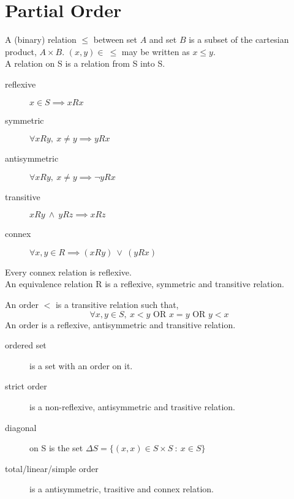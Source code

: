 \section{Partial Order}
	\begin{definition}
		A (binary) relation $\leq$ between set $A$ and set $B$
		is a subset of the cartesian product, $A \times B$.
		$(x,y) \in\ \leq $ may be written as $x \leq y$.\\
		A relation on S is a relation from S into S.
	\end{definition}
	\begin{description}
		\item[reflexive] $x \in S \implies xRx $
		\item[symmetric] $\forall xRy,\ x \neq y \implies yRx$
		\item[antisymmetric] $\forall xRy,\ x \neq y \implies \neg yRx$
		\item[transitive] $xRy\ \wedge \ yRz \implies xRz$
		\item[connex] $\forall x,y \in R \implies (xRy)\ \vee \ (yRx)$
	\end{description}
	\begin{remark}
		Every connex relation is reflexive.\\
		An equivalence relation R is a reflexive, symmetric and transitive relation.
	\end{remark}
	\begin{definition}
		An order $<$ is a transitive relation such that, 
		$$\forall x,y \in S,\ x < y \text{ OR } x = y \text{ OR } y < x$$
		An  order is a reflexive, antisymmetric and transitive relation.
	\end{definition}
	\begin{description}
		\item[ordered set] is a set with an order on it.
		\item[strict order] is a non-reflexive, antisymmetric and trasitive relation.
		\item[diagonal] on S is the set $\Delta S = \{ (x,x) \in S \times S\ :\ x \in S\}$
		\item[total/linear/simple order] is a antisymmetric, trasitive and connex relation.
	\end{description}


